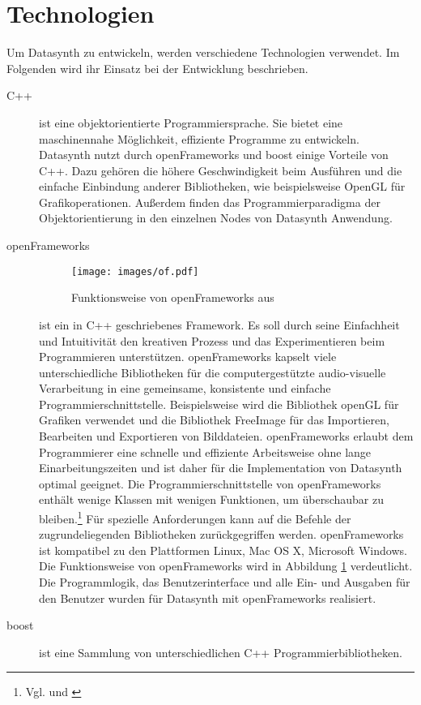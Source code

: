 \documentclass[a4paper, 
               12pt,
               DIV=calc,
               version=first,
               pdftex,
               headsepline,
               footsepline,
               bibtotocnumbered,
               liststotocnumbered]{scrreprt}
\begin{document}
\section{Technologien}
\label{sec:Technologien}
Um Datasynth zu entwickeln, werden verschiedene Technologien verwendet.
Im Folgenden wird ihr Einsatz bei der Entwicklung beschrieben.
\begin{description}
\item[C++]
ist eine objektorientierte Programmiersprache. Sie bietet
eine maschinennahe Möglichkeit, effiziente Programme zu entwickeln.
Datasynth nutzt durch openFrameworks und boost einige Vorteile
von C++. Dazu gehören die höhere Geschwindigkeit beim Ausführen
und die einfache Einbindung anderer Bibliotheken, wie 
beispielsweise OpenGL für Grafikoperationen. Außerdem
finden das Programmierparadigma der Objektorientierung
in den einzelnen Nodes von Datasynth Anwendung.
\item[openFrameworks]
\begin{figure}
\centering
\texttt{[image: images/of.pdf]}
\caption{Funktionsweise von openFrameworks aus \citep{of_wiki}}
\label{fig:of}
\end{figure}
ist ein in C++ geschriebenes Framework. Es soll durch seine
Einfachheit und Intuitivität den kreativen Prozess und das
Experimentieren beim Programmieren unterstützen. openFrameworks
kapselt viele unterschiedliche Bibliotheken für die
computergestützte audio-visuelle Verarbeitung in eine gemeinsame,
konsistente und einfache Programmierschnittstelle. Beispielsweise
wird die Bibliothek openGL für Grafiken verwendet und die
Bibliothek FreeImage für das Importieren, Bearbeiten und Exportieren von Bilddateien.
openFrameworks erlaubt dem Programmierer eine schnelle und effiziente Arbeitsweise ohne
lange Einarbeitungszeiten und ist daher für die Implementation von Datasynth optimal geeignet.
Die Programmierschnittstelle von openFrameworks enthält
wenige Klassen mit wenigen Funktionen, um überschaubar zu bleiben.\footnote{Vgl. \citep{of1} und \citep{of2}}
Für spezielle Anforderungen kann auf die Befehle der zugrundeliegenden Bibliotheken
zurückgegriffen werden.
openFrameworks ist kompatibel zu den Plattformen
Linux, Mac OS X, Microsoft Windows.
Die Funktionsweise von openFrameworks wird in Abbildung
\ref{fig:of} verdeutlicht. 
Die Programmlogik, das Benutzerinterface und alle Ein- und
Ausgaben für den Benutzer wurden für Datasynth mit openFrameworks
realisiert.
\item[boost]
ist eine Sammlung von unterschiedlichen C++ Programmierbibliotheken.

\end{description}
\end{document}

